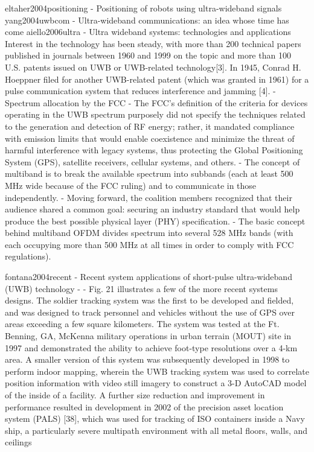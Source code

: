 eltaher2004positioning - Positioning of robots using ultra-wideband signals
yang2004uwbcom - Ultra-wideband communications: an idea whose time has come
	\cite{yang2004uwbcom}
aiello2006ultra - Ultra wideband systems: technologies and applications
	\cite{aiello2006ultra}
	Interest in the technology has been steady, with more than 200 technical papers published in journals between 1960 and 1999 on the topic and more than 100 U.S. patents issued on UWB or UWB-related technology[3].
	In 1945, Conrad H. Hoeppner filed for another UWB-related patent (which was granted in 1961) for a pulse communication system that reduces interference and jamming [4].
	- Spectrum allocation by the FCC
	- The FCC's definition of the criteria for devices operating in the UWB spectrum purposely did not specify the techniques related to the generation and detection of RF energy; rather, it mandated compliance with emission limits that would enable coexistence and minimize the threat of harmful interference with legacy systems, thus protecting the Global Positioning System (GPS), satellite receivers, cellular systems, and others.
	- The concept of multiband is to break the available spectrum into subbands (each at least 500 MHz wide because of the FCC ruling) and to communicate in those independently.
	- Moving forward, the coalition members recognized that their audience shared a common goal: securing an industry standard that would help produce the best possible physical layer (PHY) specification.
	- The basic concept behind multiband OFDM divides spectrum into several 528 MHz bands (with each occupying more than 500 MHz at all times in order to comply with FCC regulations).
	
fontana2004recent - Recent system applications of short-pulse ultra-wideband (UWB) technology
	- \cite{fontana2004recent}
	- Fig. 21 illustrates a few of the more recent systems designs. The soldier tracking system was the first to be developed and fielded, and was designed to track personnel and vehicles without the use of GPS over areas exceeding a few square kilometers. The system was tested at the Ft. Benning, GA, McKenna military operations in urban terrain (MOUT) site in 1997 and demonstrated the ability to achieve foot-type resolutions over a 4-km area. A smaller version of this system was subsequently developed in 1998 to perform indoor mapping, wherein the UWB tracking system was used to correlate position information with video still imagery to construct a 3-D AutoCAD model of the inside of a facility. A further size reduction and improvement in performance resulted in development in 2002 of the precision asset location system (PALS) [38], which was used for tracking of ISO containers inside a Navy ship, a particularly severe multipath environment with all metal floors, walls, and ceilings
	
